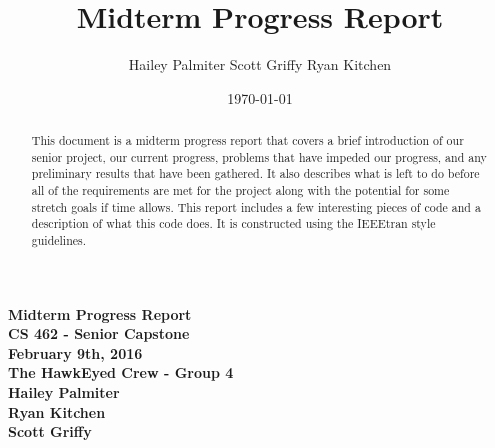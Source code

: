 \documentclass[letterpaper,10pt,titlepage]{IEEEtran}
\title{Midterm Progress Report}
\author{Hailey Palmiter Scott Griffy Ryan Kitchen}
\date{\today}
\begin{document}
   \begin{titlepage}
      \centering
      \vfill
      {\bfseries\Large
         Midterm Progress Report \\
         CS 462 - Senior Capstone\\
         \vskip2cm
         February 9th, 2016\\
         \vskip2cm
         The HawkEyed Crew - Group 4\\ 
         \vskip1cm
         Hailey Palmiter\\
         \vskip1cm
         Ryan Kitchen\\
         \vskip1cm
         Scott Griffy\\
    
      }
      \vfill
      \vskip2cm
      \begin{abstract}
      This document is a midterm progress report that covers a brief introduction of our senior project, our current progress, problems that have impeded our progress, and any preliminary results that have been gathered. It also describes what is left to do before all of the requirements are met for the project along with the potential for some stretch goals if time allows. This report includes a few interesting pieces of code and a description of what this code does. It is constructed using the IEEEtran style guidelines.
      \end{abstract}
      \vfill
   \end{titlepage}
   
   \onecolumn
   \tableofcontents
   \newpage
   \bigskip
\end{document}
